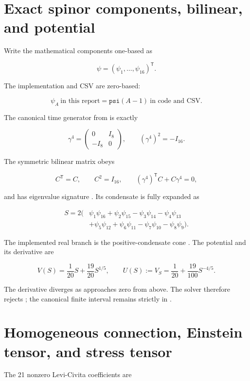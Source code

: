 \documentclass[11pt]{article}
\begin{document}
\section{Exact spinor components, bilinear, and potential}

Write the mathematical components one-based as

\[
\psi=(\psi_1,\ldots,\psi_{16})^{\mathsf T}.
\]

The implementation and CSV are zero-based:

\[
\boxed{\psi_A\ \text{in this report}=\texttt{psi}(A-1)
\ \text{in code and CSV}.}
\]

The canonical time generator from \texttt{} is exactly

\[
\gamma^4=\begin{pmatrix}0&I_8\\-I_8&0\end{pmatrix},
\qquad (\gamma^4)^2=-I_{16}.
\]

The symmetric bilinear matrix obeys

\[
C^{\mathsf T}=C,
\qquad C^2=I_{16},
\qquad (\gamma^4)^{\mathsf T}C+C\gamma^4=0,
\]

and has eigenvalue signature \texttt{}. Its condensate is fully expanded as

\[
\boxed{\begin{aligned}
S=2(&\psi_1\psi_{16}+\psi_2\psi_{15}
-\psi_3\psi_{14}-\psi_4\psi_{13}\\
&+\psi_5\psi_{12}+\psi_6\psi_{11}
-\psi_7\psi_{10}-\psi_8\psi_9).
\end{aligned}}
\]

The implemented real branch is the positive-condensate cone \texttt{}. The potential and its derivative are

\[
V(S)=\frac1{20}S+\frac{19}{20}S^{1/5},
\qquad
U(S):=V_S=\frac1{20}+\frac{19}{100}S^{-4/5}.
\]

The derivative \texttt{} diverges as \texttt{} approaches zero from above. The solver therefore rejects \texttt{}; the canonical finite interval remains strictly in \texttt{}.

\section{Homogeneous connection, Einstein tensor, and stress tensor}

The 21 nonzero Levi-Civita coefficients are
\end{document}

